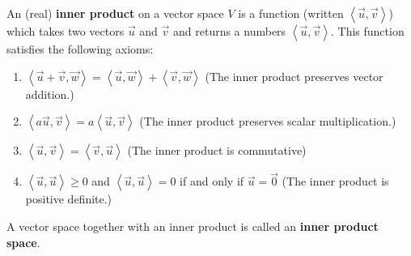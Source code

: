 \begin{definition}
An (real) \textbf{inner product} on a vector space $V$ is a function (written $\left<\vec u,\vec v\right>$) which takes two vectors $\vec u$ and $\vec v$ and returns a numbers $\left<\vec u,\vec v\right>$. This function satisfies the following axioms:
\begin{enumerate}
\item $\left< \vec u +\vec v, \vec w\right> = \left<\vec u, \vec w \right> + \left< \vec v ,    \vec w \right>$ (The inner product preserves vector addition.)
\item $\left< a\vec u ,    \vec v \right>= a\left< \vec u ,    \vec v \right>$ (The inner product preserves scalar multiplication.)
\item $\left< \vec u ,    \vec v  \right> = \left< \vec v ,    \vec u \right>$ (The inner product is commutative) 
\item $\left< \vec u ,    \vec u \right> \geq 0$ and $\left< \vec u ,   \vec u \right>=0$ if and only if $\vec u =\vec 0$ (The inner product is positive definite.)
\end{enumerate}
A vector space together with an inner product is called an \textbf{inner product space}.
\end{definition}

